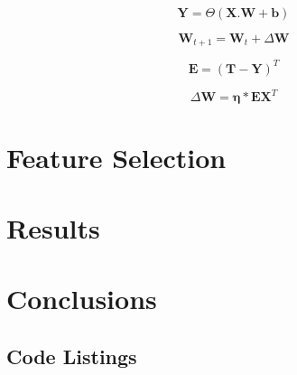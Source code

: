 \documentclass{ecsarticle}     %
\begin{document}
\begin{equation}
   \textbf{Y} = \Theta ( \textbf{X}.\textbf{W} + \textbf{b})
   \label{eqn:slp_mat}
\end{equation}

\begin{equation}	
	\textbf{W}_{t+1} = \textbf{W}_t + \Delta \textbf{W}
	\label{eqn:slp_learn_1}
\end{equation}

\begin{equation}	
	\mathbf{E} = (\mathbf{T} - \mathbf{Y})^{T}
	\label{eqn:slp_learn_2}
\end{equation}

\begin{equation}	
	\Delta \mathbf{W} = \mathbf{\eta}*\mathbf{E}\mathbf{X}^T
	\label{eqn:slp_learn_3}
\end{equation}



\section{Feature Selection}

\section{Results}

\section{Conclusions}


\newpage






\backmatter
\begin{appendix}

\newpage
\section{Code Listings}

\end{appendix}

\end{document}
